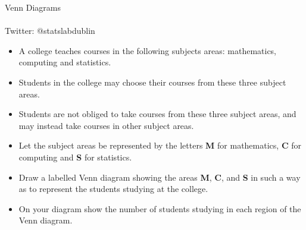 \documentclass{beamer}
\begin{document}
\begin{frame}



\begin{center}
{\Huge Venn Diagrams  } \\

\\ \vspace{0.4cm}
{\Large Twitter: @statslabdublin}
\end{center}


\end{frame}

\begin{frame}
\Large
\begin{itemize}
\item A college teaches courses in the following subjects areas: mathematics, computing and statistics.
\item Students in the college may choose their courses from these three subject areas.
\item Students are not obliged to take courses from these three subject areas, and may instead take courses in other subject areas. 
\end{itemize}

 
\end{frame}
\begin{frame}
\Large
\begin{itemize}
\item  Let the subject areas be represented by the letters \textbf{M} for mathematics, \textbf{C} for computing and \textbf{S} for statistics. \item Draw a labelled Venn diagram showing the areas \textbf{M}, \textbf{C}, and \textbf{S} in such a way as to represent the students studying at the college. \item On your diagram show the number of students studying in each region of the Venn diagram.
\end{itemize}
\end{frame}
\end{document}
